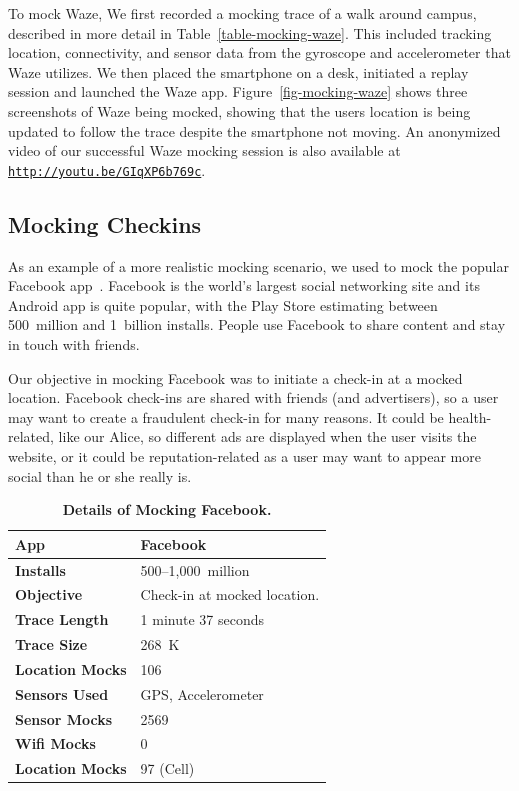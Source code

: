To mock Waze, We first recorded a mocking trace of a walk around campus,
described in more detail in Table~\ref{table-mocking-waze}.  This included
tracking location, connectivity, and sensor data from the gyroscope and
accelerometer that Waze utilizes. We then placed the smartphone on a desk,
initiated a replay session and launched the Waze app.
Figure~\ref{fig-mocking-waze} shows three screenshots of Waze being mocked,
showing that the users location is being updated to follow the trace despite
the smartphone not moving. An anonymized video of our successful Waze mocking
session is also available at
\hyperlink{http://youtu.be/GIqXP6b769c}{\texttt{http://youtu.be/GIqXP6b769c}}.

\subsection{Mocking Checkins}

As an example of a more realistic mocking scenario, we used \PocketMocker{}
to mock the popular Facebook app~\cite{facebook-playstore-url}. Facebook is
the world's largest social networking site and its Android app is quite
popular, with the Play Store estimating between 500~million and 1~billion
installs. People use Facebook to share content and stay in touch with
friends.

Our objective in mocking Facebook was to initiate a check-in at a mocked
location. Facebook check-ins are shared with friends (and advertisers), so a
user may want to create a fraudulent check-in for many reasons. It could be
health-related, like our Alice, so different ads are displayed when the user
visits the website, or it could be reputation-related as a user may want to
appear more social than he or she really is.

\begin{table}
\vspace*{-0.3in}
{\small
\begin{tabularx}{0.6\textwidth}{lX}
\textbf{App} & Facebook \\ \toprule
\textbf{Installs} & 500--1,000~million \\
\textbf{Objective} & Check-in at mocked location. \\
  \midrule
\textbf{Trace Length} & 1 minute 37 seconds \\
\textbf{Trace Size} & 268~K \\
\textbf{Location Mocks} & 106 \\
\textbf{Sensors Used} & {\small GPS, Accelerometer} \\
\textbf{Sensor Mocks} & 2569 \\
\textbf{Wifi Mocks} & 0 \\
\textbf{Location Mocks} & 97 (Cell) \\
\end{tabularx}

\caption{\textbf{Details of Mocking Facebook.}}
\vspace*{-0.2in}

\label{table-mocking-facebook}
}
\vspace*{-0.1in}
\end{table}

